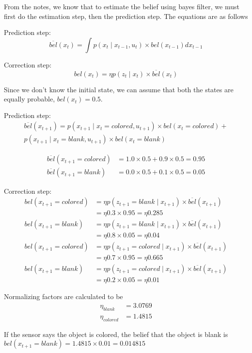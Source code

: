 \documentclass{tufte-handout}
\begin{document}
From the notes, we know that to estimate the belief using 
bayes filter, we must first do the estimation step, then
the prediction step. The equations are as follows

Prediction step:
\begin{equation}
\overline{bel}(x_t) = \int p(x_t \mid x_{t-1}, u_t) \times bel(x_{t-1}) dx_{t-1}
\end{equation}

Correction step:
\begin{equation}
bel(x_t) = \eta p(z_t \mid x_t) \times \overline{bel}(x_t)
\end{equation}


Since we don't know the initial state, we can assume 
that both the states are equally probable, $bel(x_t) = 0.5$.

Prediction step:
\begin{multline}
\overline{bel}(x_{t+1}) = p(x_{t+1} \mid x_t = colored, u_{t+1}) 
							\times bel(x_t = colored) + \\
							p(x_{t+1} \mid x_t = blank, u_{t+1}) 
							\times bel(x_t = blank)
\end{multline}

\begin{align}
\overline{bel}(x_{t+1} = colored) &= 1.0\times 0.5 + 0.9\times 0.5 = 0.95\\
\overline{bel}(x_{t+1} = blank) &= 0.0\times 0.5 + 0.1\times 0.5 = 0.05
\end{align}

Correction step:
\begin{align}
bel(x_{t+1} = colored)  &= \eta p(z_{t+1} = blank \mid x_{t+1}) \times \overline{bel}(x_{t+1})\\
					    &= \eta 0.3 \times 0.95 = \eta 0.285\\
bel(x_{t+1} = blank)    &= \eta p(z_{t+1} = blank \mid x_{t+1}) \times \overline{bel}(x_{t+1})\\
						&= \eta 0.8 \times 0.05 = \eta 0.04\\
bel(x_{t+1} = colored)  &= \eta p(z_{t+1} = colored \mid x_{t+1}) \times \overline{bel}(x_{t+1})\\
					    &= \eta 0.7 \times 0.95 = \eta 0.665\\
bel(x_{t+1} = blank)    &= \eta p(z_{t+1} = colored \mid x_{t+1}) \times \overline{bel}(x_{t+1})\\
						&= \eta 0.2 \times 0.05 = \eta 0.01
\end{align}

Normalizing factors are calculated to be
\begin{align}
\eta_{blank}   &= 3.0769\\
\eta_{colored} &= 1.4815
\end{align}

If the sensor says the object is colored, the belief that
the object is blank is $bel(x_{t+1} = blank) = 1.4815\times 0.01 = 0.014815$
\end{document}

